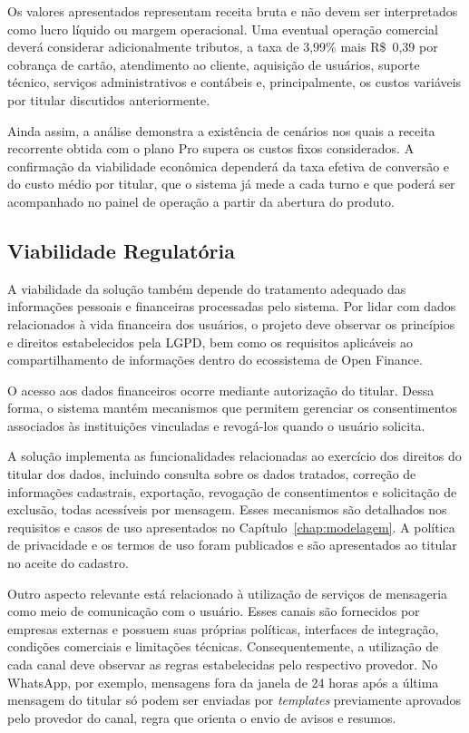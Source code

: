 Os valores apresentados representam receita bruta e não devem ser interpretados como lucro líquido ou margem operacional. Uma eventual operação comercial deverá considerar adicionalmente tributos, a taxa de 3,99\% mais R\$~0,39 por cobrança de cartão, atendimento ao cliente, aquisição de usuários, suporte técnico, serviços administrativos e contábeis e, principalmente, os custos variáveis por titular discutidos anteriormente.

Ainda assim, a análise demonstra a existência de cenários nos quais a receita recorrente obtida com o plano Pro supera os custos fixos considerados. A confirmação da viabilidade econômica dependerá da taxa efetiva de conversão e do custo médio por titular, que o sistema já mede a cada turno e que poderá ser acompanhado no painel de operação a partir da abertura do produto.

\subsection{Viabilidade Regulatória}

A viabilidade da solução também depende do tratamento adequado das informações pessoais e financeiras processadas pelo sistema. Por lidar com dados relacionados à vida financeira dos usuários, o projeto deve observar os princípios e direitos estabelecidos pela LGPD, bem como os requisitos aplicáveis ao compartilhamento de informações dentro do ecossistema de Open Finance.

O acesso aos dados financeiros ocorre mediante autorização do titular. Dessa forma, o sistema mantém mecanismos que permitem gerenciar os consentimentos associados às instituições vinculadas e revogá-los quando o usuário solicita.

A solução implementa as funcionalidades relacionadas ao exercício dos direitos do titular dos dados, incluindo consulta sobre os dados tratados, correção de informações cadastrais, exportação, revogação de consentimentos e solicitação de exclusão, todas acessíveis por mensagem. Esses mecanismos são detalhados nos requisitos e casos de uso apresentados no Capítulo~\ref{chap:modelagem}. A política de privacidade e os termos de uso foram publicados e são apresentados ao titular no aceite do cadastro.

Outro aspecto relevante está relacionado à utilização de serviços de mensageria como meio de comunicação com o usuário. Esses canais são fornecidos por empresas externas e possuem suas próprias políticas, interfaces de integração, condições comerciais e limitações técnicas. Consequentemente, a utilização de cada canal deve observar as regras estabelecidas pelo respectivo provedor. No WhatsApp, por exemplo, mensagens fora da janela de 24 horas após a última mensagem do titular só podem ser enviadas por \textit{templates} previamente aprovados pelo provedor do canal, regra que orienta o envio de avisos e resumos.

